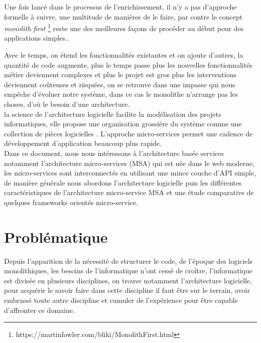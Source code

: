 \documentclass[12pt, a4paper, openany]{report}
\begin{document}
  Une fois lancé dans le processus de l’enrichissement, il n'y a pas d'approche formelle à suivre, une multitude de manières de le faire, par contre le concept \textit{monolith first} \footnote{https://martinfowler.com/bliki/MonolithFirst.html} reste une des meilleures façons de procéder au début pour des applications simples.\cite{refbibMonoFirst}. 
  
  Avec le temps, on étend les fonctionnalités existantes et on ajoute d'autres, la quantité de code augmente, plus le temps passe plus les nouvelles fonctionnalités métier deviennent complexes et plus le projet est gros plus les interventions deviennent coûteuses et risquées, on se retrouve dans une impasse qui nous empêche d’évoluer notre système, dans ce cas le monolithe n'arrange pas les choses, d’où le besoin d'une architecture.\\
  
   la science de l’architecture logicielle facilite la modélisation des projets informatiques, elle propose une organisation grossière du système comme une collection de pièces logicielles \cite{refbibFoundations}. L'approche micro-services permet une cadence de développement d'application beaucoup plus rapide.\\
  
  
  Dans ce document, nous nous intéressons à l'architecture basée services notamment l'architecture micro-services (MSA) qui est née dans le web moderne, les micro-services sont interconnectés en utilisant une mince couche d'API simple, de manière générale nous abordons l'architecture logicielle puis les différentes caractéristiques de l'architecture micro-service MSA et une étude comparative de quelques frameworks orientés micro-service.
                                                      



\chapter*{Problématique}
   Depuis l’apparition de la nécessité de structurer le code, de l'époque des logiciels monolithiques, les besoins de l'informatique n'ont cessé de croître, l'informatique est divisée en plusieurs disciplines, on trouve notamment l'architecture logicielle, pour acquérir le savoir faire dans cette discipline il faut être sur le terrain, avoir embrassé toute autre discipline et cumuler de l’expérience pour être capable d'affronter ce domaine. \\
   
\end{document}
